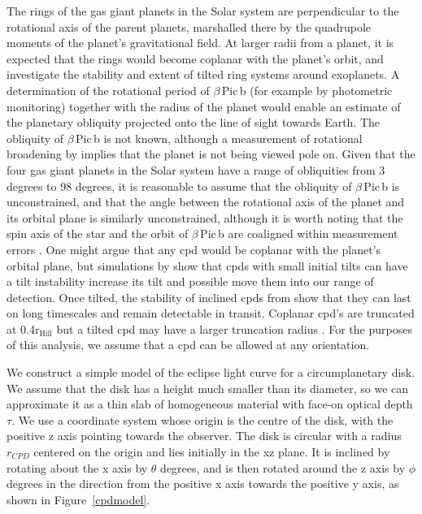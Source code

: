 \documentclass[longauth]{aa} %
\newcommand{\rhill}{$\mathrm{r_{Hill}}$} %
\newcommand{\bpb}{$\beta$\,Pic\,b}
\begin{document}
The rings of the gas giant planets in the Solar system are perpendicular to the rotational axis of the parent planets, marshalled there by the quadrupole moments of the planet's gravitational field.
%
At larger radii from a planet, it is expected that the rings would become coplanar with the planet's orbit, and \citet{Speedie20} investigate the stability and extent of tilted ring systems around exoplanets.
%
A determination of the rotational period of \bpb{} (for example by photometric monitoring) together with the radius of the planet would enable an estimate of the planetary obliquity projected onto the line of sight towards Earth.
%
The obliquity of \bpb{} is not known, although a measurement of rotational broadening by \citet{Snellen14} implies that the planet is not being viewed pole on.
%
Given that the four gas giant planets in the Solar system have a range of obliquities from 3 degrees to 98 degrees, it is reasonable to assume that the obliquity of \bpb{} is unconstrained, and that the angle between the rotational axis of the planet and its orbital plane is similarly unconstrained, although it is worth noting that the spin axis of the star and the orbit of \bpb{} are coaligned within measurement errors \citep{Kraus20}.
%
One might argue that any \ac{cpd} would be coplanar with the planet's orbital plane, but simulations by \citep{Martin20} show that \ac{cpd}s with small initial tilts can have a tilt instability increase its tilt and possible move them into our range of detection.
%
Once tilted, the stability of inclined \ac{cpd}s from \citet{Speedie20} show that they can last on long timescales and remain detectable in transit.
%
Coplanar \ac{cpd}'s are truncated at 0.4\rhill{} \citep{Martin11} but a tilted \ac{cpd} may have a larger truncation radius \citep{Lubow15,Miranda15}.
%
For the purposes of this analysis, we assume that a \ac{cpd} can be allowed at any orientation.

We construct a simple model of the eclipse light curve for a circumplanetary disk.
%
We assume that the disk has a height much smaller than its diameter, so we can approximate it as a thin slab of homogeneous material with face-on optical depth $\tau$.
%
We use a coordinate system whose origin is the centre of the disk, with the positive z axis pointing towards the observer.
%
The disk is circular with a radius $r_{CPD}$ centered on the origin and lies initially in the xz plane.
%
It is inclined by rotating about the x axis by $\theta$ degrees, and is then rotated around the z axis by $\phi$ degrees in the direction from the positive x axis towards the positive y axis, as shown in Figure~\ref{cpdmodel}.
\end{document}
